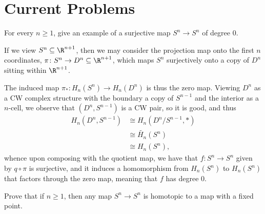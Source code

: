 \documentclass[10pt]{mypackage}
\begin{document}
\section{Current Problems}%
\begin{problem}[Problem 1]
  For every $n\geq 1$, give an example of a surjective map $S^n\rightarrow S^n$ of degree $0$.
\end{problem}
\begin{solution}
  If we view $S^n\subseteq \R^{n+1}$, then we may consider the projection map onto the first $n$ coordinates, $\pi\colon S^n\rightarrow D^n\subseteq \R^{n+1}$, which maps $S^n$ surjectively onto a copy of $D^n$ sitting within $\R^{n+1}$.

  The induced map $\pi_{\ast}\colon H_n\left( S^n \right)\rightarrow H_n\left( D^n \right)$ is thus the zero map. Viewing $D^n$ as a CW complex structure with the boundary a copy of $S^{n-1}$ and the interior as a $n$-cell, we observe that $\left( D^n,S^{n-1} \right)$ is a CW pair, so it is good, and thus
  \begin{align*}
    H_n\left( D^n,S^{n-1} \right) &\cong H_n\left( D^{n}/S^{n-1},\ast \right)\\
                                  &\cong \widetilde{H_n}\left( S^n \right)\\
                                  &\cong H_n\left( S^n \right),
  \end{align*}
  whence upon composing with the quotient map, we have that $f\colon S^n\rightarrow S^n$ given by $q\circ\pi$ is surjective, and it induces a homomorphism from $H_n\left( S^n \right)$ to $H_n\left( S^n \right)$ that factors through the zero map, meaning that $f$ has degree $0$.
\end{solution}
\begin{problem}[Problem 2]
  Prove that if $n\geq 1$, then any map $S^n\rightarrow S^n$ is homotopic to a map with a fixed point.
\end{problem}
\end{document}
